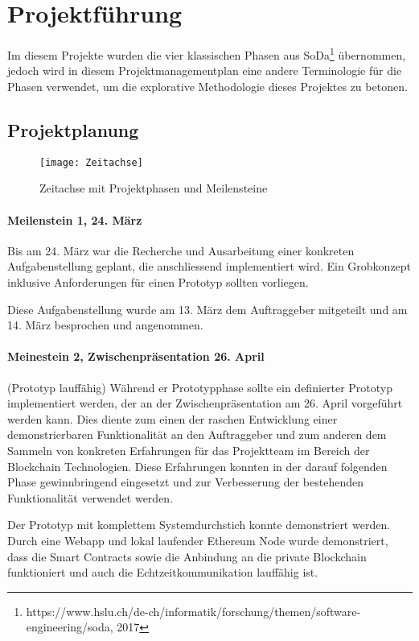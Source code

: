 \section{Projektführung}
Im diesem Projekte wurden die vier klassischen Phasen aus SoDa\footnote{https://www.hslu.ch/de-ch/informatik/forschung/themen/software-engineering/soda, 2017} übernommen, jedoch wird in diesem Projektmanagementplan eine andere Terminologie für die Phasen verwendet, um die explorative Methodologie dieses Projektes zu betonen.

\subsection{Projektplanung}

\begin{figure}[H]
\centering
\texttt{[image: Zeitachse]}
\caption{Zeitachse mit Projektphasen und Meilensteine}
\label{fig:Zeitachse mit Projektphasen und Meilensteine}
\end{figure}

\paragraph{Meilenstein 1, 24. März}
\label{pm_para:Initialisierung}
Bis am 24. März war die Recherche und Ausarbeitung einer konkreten Aufgabenstellung geplant, die anschliessend implementiert wird. Ein Grobkonzept inklusive Anforderungen für einen Prototyp sollten vorliegen.

Diese Aufgabenstellung wurde am 13. März dem Auftraggeber mitgeteilt und am 14. März besprochen und angenommen.

\paragraph{Meinestein 2, Zwischenpräsentation 26. April}
(Prototyp lauffähig) Während er Prototypphase sollte ein definierter Prototyp implementiert werden, der an der Zwischenpräsentation am 26. April vorgeführt werden kann. Dies diente zum einen der raschen Entwicklung einer demonstrierbaren Funktionalität an den Auftraggeber und zum anderen dem Sammeln von konkreten Erfahrungen für das Projektteam im Bereich der Blockchain Technologien. Diese Erfahrungen konnten in der darauf folgenden Phase gewinnbringend eingesetzt und zur Verbesserung der bestehenden Funktionalität verwendet werden.

Der Prototyp mit komplettem Systemdurchstich konnte demonstriert werden. Durch eine Webapp und lokal laufender Ethereum Node wurde demonstriert, dass die Smart Contracts sowie die Anbindung an die private Blockchain funktioniert und auch die Echtzeitkommunikation lauffähig ist.

